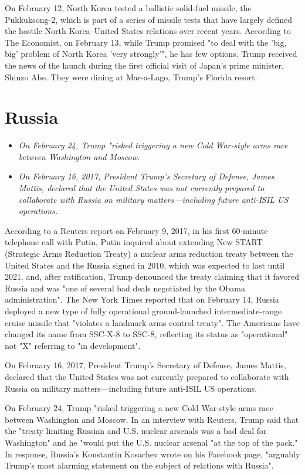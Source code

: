 On February 12, North Korea tested a ballistic solid-fuel missile, the
Pukkuksong-2, which is part of a series of missile tests that have
largely defined the hostile North Korea--United States relations over
recent years. According to The Economist, on February 13, while Trump
promised "to deal with the 'big, big' problem of North Korea 'very
strongly'", he has few options. Trump received the news of the launch
during the first official visit of Japan's prime minister, Shinzo Abe.
They were dining at Mar-a-Lago, Trump's Florida resort.

\section{Russia}\label{russia}

\begin{itemize}
\item
  \emph{On February 24, Trump "risked triggering a new Cold War-style
  arms race between Washington and Moscow.}
\item
  \emph{On February 16, 2017, President Trump's Secretary of Defense,
  James Mattis, declared that the United States was not currently
  prepared to collaborate with Russia on military matters---including
  future anti-ISIL US operations.}
\end{itemize}

According to a Reuters report on February 9, 2017, in his first
60-minute telephone call with Putin, Putin inquired about extending New
START (Strategic Arms Reduction Treaty) a nuclear arms reduction treaty
between the United States and the Russia signed in 2010, which was
expected to last until 2021. and, after ratification, Trump denounced
the treaty claiming that it favored Russia and was "one of several bad
deals negotiated by the Obama administration". The New York Times
reported that on February 14, Russia deployed a new type of fully
operational ground-launched intermediate-range cruise missile that
"violates a landmark arms control treaty". The Americans have changed
its name from SSC-X-8 to SSC-8, reflecting its status as "operational"
not "X" referring to "in development".

On February 16, 2017, President Trump's Secretary of Defense, James
Mattis, declared that the United States was not currently prepared to
collaborate with Russia on military matters---including future anti-ISIL
US operations.

On February 24, Trump "risked triggering a new Cold War-style arms race
between Washington and Moscow. In an interview with Reuters, Trump said
that the "treaty limiting Russian and U.S. nuclear arsenals was a bad
deal for Washington" and he "would put the U.S. nuclear arsenal "at the
top of the pack." In response, Russia's Konstantin Kosachev wrote on his
Facebook page, "arguably Trump's most alarming statement on the subject
of relations with Russia".

